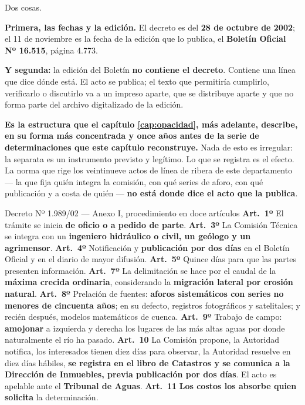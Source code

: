 \begin{cautela}
Dos cosas.

\textbf{Primera, las fechas y la edición.} El decreto es del \textbf{28 de octubre de 2002}; el 11 de noviembre es la fecha de la edición que lo publica, el \textbf{Boletín Oficial Nº 16.515}, página 4.773.

\textbf{Y segunda:} la edición del Boletín \textbf{no contiene el decreto}. Contiene una línea
que dice dónde está. El acto se publica; el texto que permitiría cumplirlo, verificarlo o
discutirlo va a un impreso aparte, que se distribuye aparte y que no forma parte del archivo
digitalizado de la edición.

\textbf{Es la estructura que el capítulo \ref{cap:opacidad}, más adelante, describe, en su forma más concentrada y once años antes de la serie de determinaciones que este capítulo reconstruye.} Nada de esto
es irregular: la separata es un instrumento previsto y legítimo. Lo que se registra es el
efecto. La norma que rige los veintinueve actos de línea de ribera de este departamento --- la que fija quién integra la comisión, con qué series de aforo, con qué
publicación y a costa de quién --- \textbf{no está donde dice el acto que la publica}.
\end{cautela}

\begin{ficha}{Decreto Nº 1.989/02 --- Anexo I, procedimiento en doce artículos}
\textbf{Art.\ 1º} El trámite se inicia \textbf{de oficio o a pedido de parte}.
\textbf{Art.\ 3º} La Comisión Técnica se integra con un \textbf{ingeniero hidráulico o civil,
un geólogo y un agrimensor}.
\textbf{Art.\ 4º} Notificación y \textbf{publicación por dos días} en el Boletín Oficial y en
el diario de mayor difusión.
\textbf{Art.\ 5º} Quince días para que las partes presenten información.
\textbf{Art.\ 7º} La delimitación se hace por el caudal de la \textbf{máxima crecida
ordinaria}, considerando la \textbf{migración lateral por erosión natural}.
\textbf{Art.\ 8º} Prelación de fuentes: \textbf{aforos sistemáticos con series no menores de
cincuenta años}; en su defecto, registros fotográficos y satelitales; y recién después,
modelos matemáticos de cuenca.
\textbf{Art.\ 9º} Trabajo de campo: \textbf{amojonar} a izquierda y derecha los lugares de las
más altas aguas por donde naturalmente el río ha pasado.
\textbf{Art.\ 10} La Comisión propone, la Autoridad notifica, los interesados tienen diez días
para observar, la Autoridad resuelve en diez días hábiles, \textbf{se registra en el libro de
Catastros y se comunica a la Dirección de Inmuebles, previa publicación por dos días}. El acto
es apelable ante el \textbf{Tribunal de Aguas}.
\textbf{Art.\ 11} \textbf{Los costos los absorbe quien solicita} la determinación.
\end{ficha}


